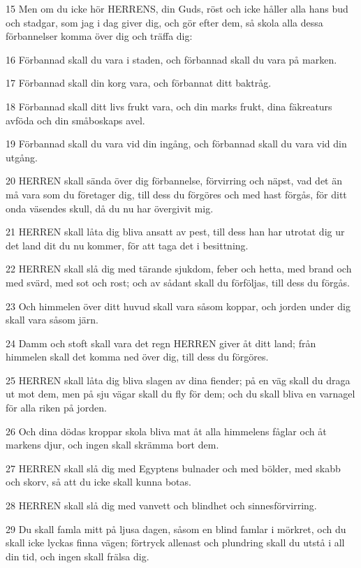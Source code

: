 \par 15 Men om du icke hör HERRENS, din Guds, röst och icke håller alla hans bud och stadgar, som jag i dag giver dig, och gör efter dem, så skola alla dessa förbannelser komma över dig och träffa dig:
\par 16 Förbannad skall du vara i staden, och förbannad skall du vara på marken.
\par 17 Förbannad skall din korg vara, och förbannat ditt baktråg.
\par 18 Förbannad skall ditt livs frukt vara, och din marks frukt, dina fäkreaturs avföda och din småboskaps avel.
\par 19 Förbannad skall du vara vid din ingång, och förbannad skall du vara vid din utgång.
\par 20 HERREN skall sända över dig förbannelse, förvirring och näpst, vad det än må vara som du företager dig, till dess du förgöres och med hast förgås, för ditt onda väsendes skull, då du nu har övergivit mig.
\par 21 HERREN skall låta dig bliva ansatt av pest, till dess han har utrotat dig ur det land dit du nu kommer, för att taga det i besittning.
\par 22 HERREN skall slå dig med tärande sjukdom, feber och hetta, med brand och med svärd, med sot och rost; och av sådant skall du förföljas, till dess du förgås.
\par 23 Och himmelen över ditt huvud skall vara såsom koppar, och jorden under dig skall vara såsom järn.
\par 24 Damm och stoft skall vara det regn HERREN giver åt ditt land; från himmelen skall det komma ned över dig, till dess du förgöres.
\par 25 HERREN skall låta dig bliva slagen av dina fiender; på en väg skall du draga ut mot dem, men på sju vägar skall du fly för dem; och du skall bliva en varnagel för alla riken på jorden.
\par 26 Och dina dödas kroppar skola bliva mat åt alla himmelens fåglar och åt markens djur, och ingen skall skrämma bort dem.
\par 27 HERREN skall slå dig med Egyptens bulnader och med bölder, med skabb och skorv, så att du icke skall kunna botas.
\par 28 HERREN skall slå dig med vanvett och blindhet och sinnesförvirring.
\par 29 Du skall famla mitt på ljusa dagen, såsom en blind famlar i mörkret, och du skall icke lyckas finna vägen; förtryck allenast och plundring skall du utstå i all din tid, och ingen skall frälsa dig.
